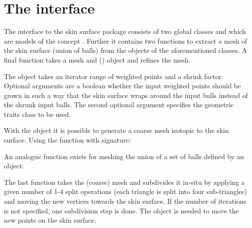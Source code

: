 
\section{The interface}
The interface to the skin surface package consists of two global
classes  and  which are
models of the concept . Further it contains two
functions to extract a mesh of the skin surface (union of balls) from
the objects of the aforementioned classes. A final function takes a
mesh and  () object and
refines the mesh.

The  object takes an iterator range of weighted
points and a shrink factor. Optional arguments are a boolean whether
the input weighted points should be grown in such a way that the skin
surface wraps around the input balls instead of the shrunk input
balls.  The second optional argument specifies the geometric traits
class to be used.


With the  object it is possible to generate a
coarse mesh isotopic to the skin surface. Using the function
 with signature:


An analogue function exists for meshing the union of a set of balls
defined by an  object:


The last function takes the (coarse) mesh and subdivides it in-situ by
applying a given number of 1-4 split operations (each triangle is
split into four sub-triangles) and moving the new vertices towards the
skin surface. If the number of iterations is not specified, one
subdivision step is done. The  object is
needed to move the new points on the skin surface.

